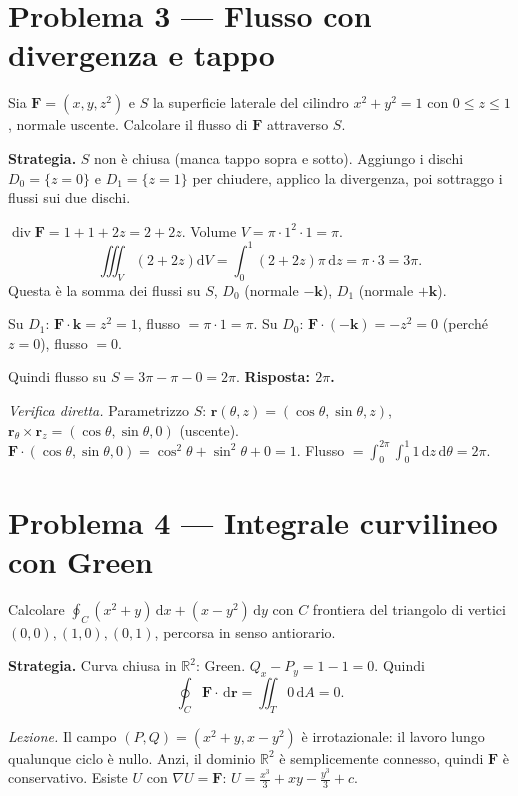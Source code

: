 \documentclass[11pt,a4paper,openany]{book}
\theoremstyle{plain}
\theoremstyle{definition}
\theoremstyle{remark}
\newcommand{\R}{\mathbb{R}}
\newcommand{\dd}{\,\mathrm{d}}
\newcommand{\Div}{\operatorname{div}}
\renewcommand{\vec}[1]{\mathbf{#1}}
\newcommand{\F}{\mathbf{F}}
\newcommand{\rr}{\mathbf{r}}
\newcommand{\dV}{\mathrm{d}V}
\begin{document}
\section*{Problema 3 --- Flusso con divergenza e tappo}

Sia $\F=(x,y,z^2)$ e $S$ la superficie laterale del cilindro
$x^2+y^2=1$ con $0\le z\le 1$, normale uscente. Calcolare il flusso di $\F$
attraverso $S$.

\begin{esempio}
\textbf{Strategia.} $S$ non \`e chiusa (manca tappo sopra e sotto). Aggiungo i
dischi $D_0=\{z=0\}$ e $D_1=\{z=1\}$ per chiudere, applico la divergenza, poi
sottraggo i flussi sui due dischi.

$\Div\F=1+1+2z=2+2z$. Volume $V=\pi\cdot 1^2\cdot 1=\pi$.
\[
  \iiint_V(2+2z)\dV=\int_0^1(2+2z)\pi\dd z=\pi\cdot 3=3\pi.
\]
Questa \`e la somma dei flussi su $S$, $D_0$ (normale $-\vec{k}$), $D_1$
(normale $+\vec{k}$).

Su $D_1$: $\F\cdot\vec{k}=z^2=1$, flusso $=\pi\cdot 1=\pi$.
Su $D_0$: $\F\cdot(-\vec{k})=-z^2=0$ (perch\'e $z=0$), flusso $=0$.

Quindi flusso su $S=3\pi-\pi-0=2\pi$. \textbf{Risposta: $2\pi$.}

\textsl{Verifica diretta.} Parametrizzo $S$: $\rr(\theta,z)=(\cos\theta,\sin\theta,z)$,
$\rr_\theta\times\rr_z=(\cos\theta,\sin\theta,0)$ (uscente).
$\F\cdot(\cos\theta,\sin\theta,0)=\cos^2\theta+\sin^2\theta+0=1$.
Flusso $=\int_0^{2\pi}\int_0^1 1\dd z\dd\theta=2\pi$. \checkmark
\end{esempio}

\section*{Problema 4 --- Integrale curvilineo con Green}

Calcolare $\oint_C(x^2+y)\dd x+(x-y^2)\dd y$ con $C$ frontiera del triangolo
di vertici $(0,0),(1,0),(0,1)$, percorsa in senso antiorario.

\begin{esempio}
\textbf{Strategia.} Curva chiusa in $\R^2$: Green.
$Q_x-P_y=1-1=0$. Quindi
\[
  \oint_C\F\cdot\dd\rr=\iint_T 0\dd A=0.
\]

\textsl{Lezione.} Il campo $(P,Q)=(x^2+y,x-y^2)$ \`e irrotazionale: il lavoro
lungo qualunque ciclo \`e nullo. Anzi, il dominio $\R^2$ \`e semplicemente
connesso, quindi $\F$ \`e conservativo. Esiste $U$ con $\nabla U=\F$:
$U=\frac{x^3}{3}+xy-\frac{y^3}{3}+c$.
\end{esempio}
\end{document}
